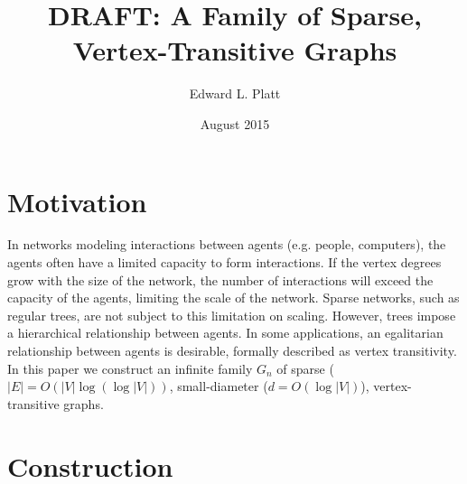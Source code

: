 \documentclass{article}
\title{DRAFT: A Family of Sparse, Vertex-Transitive Graphs}
\author{Edward L. Platt}
\date{August 2015}
\begin{document}
\maketitle

\section{Motivation}
In networks modeling interactions between agents (e.g. people, computers),
the agents often have a limited capacity to form interactions.
If the vertex degrees grow with the size of the network,
the number of interactions will exceed the capacity of the agents,
limiting the scale of the network.
Sparse networks, such as regular trees, are not subject to this limitation on scaling.
However, trees impose a hierarchical relationship between agents.
In some applications, an egalitarian relationship between agents is desirable,
formally described as vertex transitivity.
In this paper we construct an infinite family $G_n$
of sparse ($|E| = O(|V|\log(\log |V|))$,
small-diameter ($d = O(\log |V|)$), vertex-transitive graphs.

\section{Construction}
\end{document}

